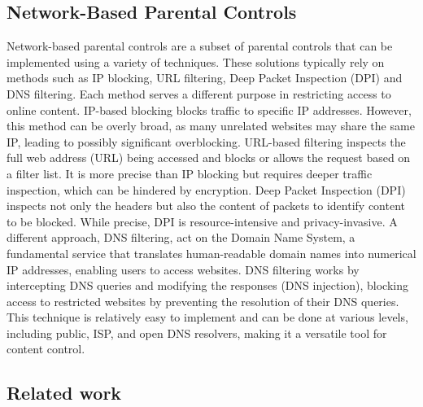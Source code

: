 \subsection{Network-Based Parental Controls}
Network-based parental controls are a subset of parental controls that can be implemented using a variety of techniques. 
These solutions typically rely on methods such as IP blocking, URL filtering, Deep Packet Inspection (DPI) and DNS filtering\cite{noauthor_overview_nodate}. 
Each method serves a different purpose in restricting access to online content. IP-based blocking blocks traffic to specific IP addresses.
However, this method can be overly broad, as many unrelated websites may share the same IP, leading to possibly significant overblocking.
URL-based filtering inspects the full web address (URL) being accessed and blocks or allows the request based on a filter list.
It is more precise than IP blocking but requires deeper traffic inspection, which can be hindered by encryption.
Deep Packet Inspection (DPI) inspects not only the headers but also the content of packets to identify content to be blocked. While precise, DPI is resource-intensive and privacy-invasive. A different approach, DNS filtering, act on the Domain Name System, a fundamental service that translates human-readable domain names into numerical IP addresses, enabling users to access websites. 
DNS filtering works by intercepting DNS queries and modifying the responses (DNS injection), blocking access to restricted websites by preventing the resolution of their DNS queries.
This technique is relatively easy to implement and can be done at various levels, including public, ISP, and open DNS resolvers, making it a versatile tool for content control\cite{cheng_-depth_2022}.





\subsection{Related work}

